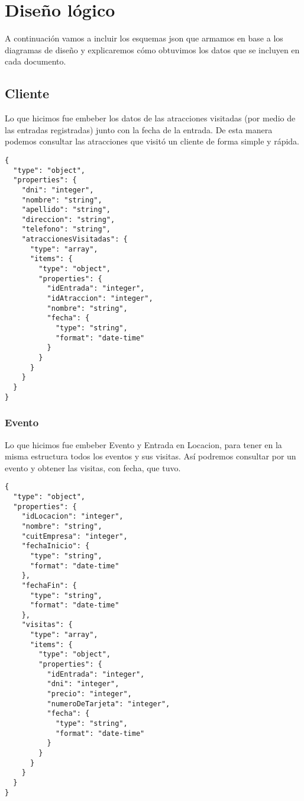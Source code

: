 \section{Diseño lógico}

\par A continuación vamos a incluir los esquemas json que armamos en base a los diagramas de diseño y explicaremos cómo obtuvimos los datos que se incluyen en cada documento.

\subsection{Cliente}
\par Lo que hicimos fue embeber los datos de las atracciones visitadas (por medio de las entradas registradas) junto con la fecha de la entrada.
De esta manera podemos consultar las atracciones que visitó un cliente de forma simple y rápida.
\begin{verbatim}
{
  "type": "object",
  "properties": {
    "dni": "integer",
    "nombre": "string",
    "apellido": "string",
    "direccion": "string",
    "telefono": "string",
    "atraccionesVisitadas": {
      "type": "array",
      "items": {
        "type": "object",
        "properties": {
          "idEntrada": "integer",
          "idAtraccion": "integer",
          "nombre": "string",
          "fecha": {
            "type": "string",
            "format": "date-time"
          }
        }
      }
    }
  }
}
\end{verbatim}

\subsubsection{Evento}
\par Lo que hicimos fue embeber Evento y Entrada en Locacion, para tener en la misma estructura todos los eventos y sus visitas.
Así podremos consultar por un evento y obtener las visitas, con fecha, que tuvo.
\begin{verbatim}
{
  "type": "object",
  "properties": {
    "idLocacion": "integer",
    "nombre": "string",
    "cuitEmpresa": "integer",
    "fechaInicio": {
      "type": "string",
      "format": "date-time"
    },
    "fechaFin": {
      "type": "string",
      "format": "date-time"
    },
    "visitas": {
      "type": "array",
      "items": {
        "type": "object",
        "properties": {
          "idEntrada": "integer",
          "dni": "integer",
          "precio": "integer",
          "numeroDeTarjeta": "integer",
          "fecha": {
            "type": "string",
            "format": "date-time"
          }
        }
      }
    }
  }
}
\end{verbatim}

